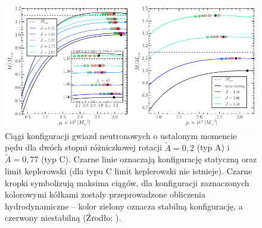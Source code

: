 \documentclass{bachelor_thesis}
\begin{document}
        \begin{figure}[h!]
            \centering
            \includegraphics[scale=.52]{figures/RysStab.png}
            \caption{Ciągi konfiguracji gwiazd neutronowych o ustalonym momencie pędu dla dwóch stopni różniczkowej rotacji $\tilde{A}=0,2$ (typ A) i $\tilde{A}=0,77$ (typ C). Czarne linie oznaczają konfigurację statyczną oraz limit keplerowski (dla typu C limit keplerowski nie istnieje). Czarne kropki symbolizują maksima ciągów, dla konfiguracji zaznaczonych kolorowymi kółkami zostaly przeprowadzone obliczenia hydrodynamiczne -- kolor zielony oznacza stabilną konfigurację, a czerwony niestabilną (Źrodło: \citealp{Weih2018}).}
            \label{RysStab}
        \end{figure}
\end{document}
